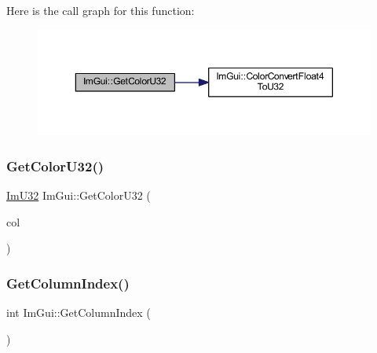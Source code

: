 Here is the call graph for this function\+:
\nopagebreak
\begin{figure}[H]
\begin{center}
\leavevmode
\includegraphics[width=350pt]{namespace_im_gui_ac701752365ddd58cecc1956fc62921a8_cgraph}
\end{center}
\end{figure}
\mbox{\label{namespace_im_gui_a834649713437e8fdfa0e5a4fb780d35b}} 
\subsubsection{\texorpdfstring{Get\+Color\+U32()}{GetColorU32()}\hspace{0.1cm}{\footnotesize\ttfamily [3/3]}}
{\footnotesize\ttfamily \mbox{\hyperlink{imgui_8h_a118cff4eeb8d00e7d07ce3d6460eed36}{Im\+U32}} Im\+Gui\+::\+Get\+Color\+U32 (\begin{DoxyParamCaption}\item[{\mbox{\hyperlink{imgui_8h_a118cff4eeb8d00e7d07ce3d6460eed36}{Im\+U32}}}]{col }\end{DoxyParamCaption})}

\mbox{\label{namespace_im_gui_acc31f8eea4fcfb86edeb3ac12d82fc05}} 
\subsubsection{\texorpdfstring{Get\+Column\+Index()}{GetColumnIndex()}}
{\footnotesize\ttfamily int Im\+Gui\+::\+Get\+Column\+Index (\begin{DoxyParamCaption}{ }\end{DoxyParamCaption})}

